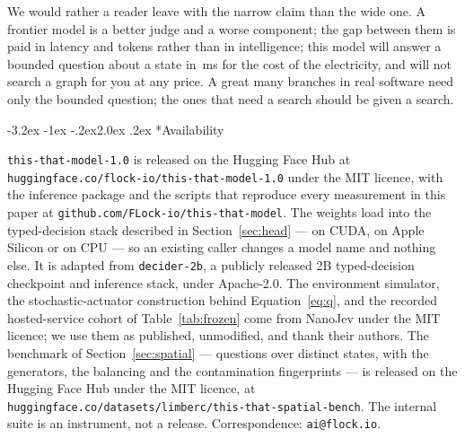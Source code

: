 \documentclass[11pt]{article}
\makeatletter
\renewcommand\section{\@startsection{section}{1}{\z@}%
  {-3.2ex \@plus -1ex \@minus -.2ex}{2.0ex \@plus.2ex}%
  {\normalfont\large\bfseries\color{accent}}}
\newcommand{\Ours}{\texttt{this-that-model-1.0}}
\newcommand{\1}{\mathbf{1}}
\makeatother
\begin{document}
We would rather a reader leave with the narrow claim than the wide one. A frontier model is a better judge and a worse component; the gap
between them is paid in latency and tokens rather than in intelligence; this model will answer a
bounded question about a state in \oursMsPerDecision{}\,ms for the cost of the electricity, and
will not search a graph for you at any price. A great many branches in real software need only the
bounded question; the ones that need a search should be given a search.

\section*{Availability}

\begin{sloppypar}
\Ours{} is released on the Hugging Face Hub at
\texttt{huggingface.co/\allowbreak flock-io/\allowbreak this-\allowbreak that-\allowbreak model-1.0} under the MIT licence,
with the inference package and the scripts that reproduce every measurement in this paper at
\texttt{github.com/\allowbreak FLock-io/\allowbreak this-\allowbreak that-\allowbreak model}. The weights load into the
typed-decision stack described in Section~\ref{sec:head} --- on CUDA, on Apple Silicon or on
CPU --- so an existing caller changes a model name and nothing else. It is adapted from \texttt{decider-2b},
a publicly released 2B typed-decision checkpoint and inference stack, under Apache-2.0. The
environment simulator, the stochastic-actuator construction behind Equation~\eqref{eq:q}, and the
recorded hosted-service cohort of Table~\ref{tab:frozen} come from NanoJev under the MIT licence; we
use them as published, unmodified, and thank their authors. The benchmark of Section~\ref{sec:spatial} --- \spatialTotalN{} questions over \spatialStates{}
distinct states, with the generators, the balancing and the contamination fingerprints --- is
released on the Hugging Face Hub under the MIT licence, at
\texttt{huggingface.co/\allowbreak datasets/\allowbreak limberc/\allowbreak this-\allowbreak that-\allowbreak spatial-bench}. The internal suite is an
instrument, not a release. Correspondence:
\texttt{ai@flock.io}.
\end{sloppypar}



\end{document}
